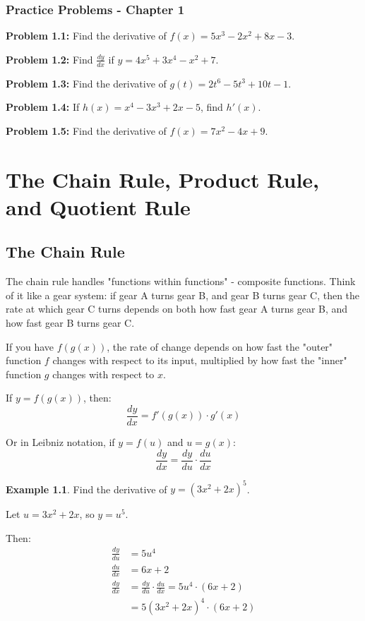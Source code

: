 \documentclass[12pt,a4paper]{book}
\theoremstyle{definition}
\newtheorem{example}{Example}[chapter]
\begin{document}
\subsection{Practice Problems - Chapter 1}

\textbf{Problem 1.1:} Find the derivative of $f(x) = 5x^3 - 2x^2 + 8x - 3$.

\textbf{Problem 1.2:} Find $\frac{dy}{dx}$ if $y = 4x^5 + 3x^4 - x^2 + 7$.

\textbf{Problem 1.3:} Find the derivative of $g(t) = 2t^6 - 5t^3 + 10t - 1$.

\textbf{Problem 1.4:} If $h(x) = x^4 - 3x^3 + 2x - 5$, find $h'(x)$.

\textbf{Problem 1.5:} Find the derivative of $f(x) = 7x^2 - 4x + 9$.

\chapter{The Chain Rule, Product Rule, and Quotient Rule}

\section{The Chain Rule}

\begin{intuition}
The chain rule handles "functions within functions" - composite functions. Think of it like a gear system: if gear A turns gear B, and gear B turns gear C, then the rate at which gear C turns depends on both how fast gear A turns gear B, and how fast gear B turns gear C.

If you have $f(g(x))$, the rate of change depends on how fast the "outer" function $f$ changes with respect to its input, multiplied by how fast the "inner" function $g$ changes with respect to $x$.
\end{intuition}

\begin{keyformula}
If $y = f(g(x))$, then:
$$\frac{dy}{dx} = f'(g(x)) \cdot g'(x)$$

Or in Leibniz notation, if $y = f(u)$ and $u = g(x)$:
$$\frac{dy}{dx} = \frac{dy}{du} \cdot \frac{du}{dx}$$
\end{keyformula}

\begin{example}
Find the derivative of $y = (3x^2 + 2x)^5$.

Let $u = 3x^2 + 2x$, so $y = u^5$.

Then:
\begin{align}
\frac{dy}{du} &= 5u^4\\
\frac{du}{dx} &= 6x + 2\\
\frac{dy}{dx} &= \frac{dy}{du} \cdot \frac{du}{dx} = 5u^4 \cdot (6x + 2)\\
&= 5(3x^2 + 2x)^4 \cdot (6x + 2)
\end{align}
\end{example}
\end{document}
